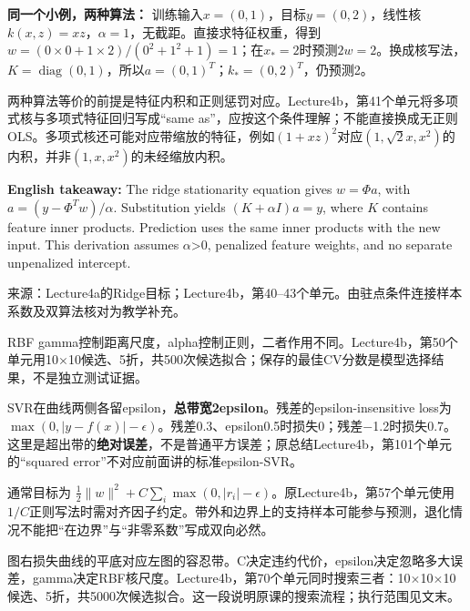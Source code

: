 \textbf{同一个小例，两种算法：} 训练输入\(x=(0,1)\)，目标\(y=(0,2)\)，线性核\(k(x,z)=xz\)，\(\alpha=1\)，无截距。直接求特征权重，得到\(w=(0\times0+1\times2)/(0^2+1^2+1)=1\)；在\(x_*=2\)时预测\(2w=2\)。换成核写法，\(K=\operatorname{diag}(0,1)\)，所以\(a=(0,1)^T\)；\(k_*=(0,2)^T\)，仍预测2。


两种算法等价的前提是特征内积和正则惩罚对应。Lecture4b，第41个单元将多项式核与多项式特征回归写成“same as”，应按这个条件理解；不能直接换成无正则OLS。多项式核还可能对应带缩放的特征，例如\((1+xz)^2\)对应\((1,\sqrt2x,x^2)\)的内积，并非\((1,x,x^2)\)的未经缩放内积。


\textbf{English takeaway:} The ridge stationarity equation gives \(w=\Phi a\), with \(a=(y-\Phi^Tw)/\alpha\). Substitution yields \((K+\alpha I)a=y\), where \(K\) contains feature inner products. Prediction uses the same inner products with the new input. This derivation assumes \ensuremath{\alpha}>0, penalized feature weights, and no separate unpenalized intercept.


来源：Lecture4a的Ridge目标；Lecture4b，第40–43个单元。由驻点条件连接样本系数及双算法核对为教学补充。


RBF gamma控制距离尺度，alpha控制正则，二者作用不同。Lecture4b，第50个单元用10\ensuremath{\times}10候选、5折，共500次候选拟合；保存的最佳CV分数是模型选择结果，不是独立测试证据。





SVR在曲线两侧各留epsilon，\textbf{总带宽2epsilon}。残差的epsilon-insensitive loss为 \(\max(0,|y-f(x)|-\epsilon)\)。残差0.3、epsilon0.5时损失0；残差\ensuremath{-}1.2时损失0.7。这里是超出带的\textbf{绝对误差}，不是普通平方误差；原总结Lecture4b，第101个单元的“squared error”不对应前面讲的标准epsilon-SVR。


通常目标为 \(\frac12\|w\|^2+C\sum_i\max(0,|r_i|-\epsilon)\)。原Lecture4b，第57个单元使用 \(1/C\)正则写法时需对齐因子约定。带外和边界上的支持样本可能参与预测，退化情况不能把“在边界”与“非零系数”写成双向必然。




图右损失曲线的平底对应左图的容忍带。C决定违约代价，epsilon决定忽略多大误差，gamma决定RBF核尺度。Lecture4b，第70个单元同时搜索三者：10\ensuremath{\times}10\ensuremath{\times}10候选、5折，共5000次候选拟合。这一段说明原课的搜索流程；执行范围见文末。






